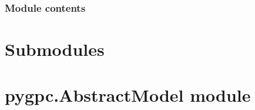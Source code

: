 \documentclass[letterpaper,10pt,english,openany,oneside]{sphinxmanual}
\begin{document}
\subsubsection{Module contents}
\label{\detokenize{pygpc.testfunctions:module-pygpc.testfunctions}}\label{\detokenize{pygpc.testfunctions:module-contents}}

\section{Submodules}
\label{\detokenize{pygpc:submodules}}

\section{pygpc.AbstractModel module}
\label{\detokenize{pygpc:module-pygpc.AbstractModel}}\label{\detokenize{pygpc:pygpc-abstractmodel-module}}
\end{document}
